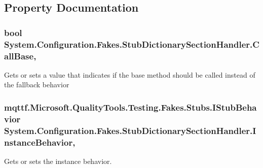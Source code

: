 \subsection{Property Documentation}
\hypertarget{class_system_1_1_configuration_1_1_fakes_1_1_stub_dictionary_section_handler_ab42df553c7b23c284595ff75441c9b38}{
\subsubsection[{Call\-Base}]{\setlength{\rightskip}{0pt plus 5cm}bool System.\-Configuration.\-Fakes.\-Stub\-Dictionary\-Section\-Handler.\-Call\-Base\hspace{0.3cm}{\ttfamily [get]}, {\ttfamily [set]}}}\label{class_system_1_1_configuration_1_1_fakes_1_1_stub_dictionary_section_handler_ab42df553c7b23c284595ff75441c9b38}


Gets or sets a value that indicates if the base method should be called instead of the fallback behavior

\hypertarget{class_system_1_1_configuration_1_1_fakes_1_1_stub_dictionary_section_handler_acfafa49ebbb70205429f41f75683efe2}{
\subsubsection[{Instance\-Behavior}]{\setlength{\rightskip}{0pt plus 5cm}mqttf.\-Microsoft.\-Quality\-Tools.\-Testing.\-Fakes.\-Stubs.\-I\-Stub\-Behavior System.\-Configuration.\-Fakes.\-Stub\-Dictionary\-Section\-Handler.\-Instance\-Behavior\hspace{0.3cm}{\ttfamily [get]}, {\ttfamily [set]}}}\label{class_system_1_1_configuration_1_1_fakes_1_1_stub_dictionary_section_handler_acfafa49ebbb70205429f41f75683efe2}


Gets or sets the instance behavior.

